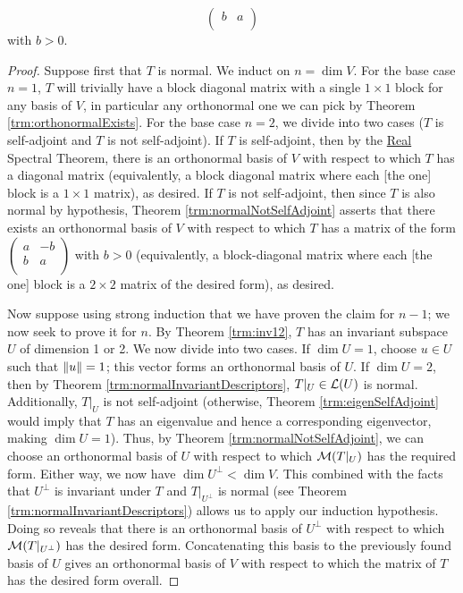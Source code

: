 \documentclass[../main.tex]{subfiles}
\begin{document}
\begin{itemize}
\begin{theorem}
\begin{enumerate}[label={\textup{(}\alph*\textup{)}}]
\begin{equation*}
\begin{pmatrix}
                    b & a\\
                \end{pmatrix}
            \end{equation*}
            with $b>0$.
        \end{enumerate}
        \begin{proof}
            Suppose first that $T$ is normal. We induct on $n=\dim V$. For the base case $n=1$, $T$ will trivially have a block diagonal matrix with a single $1\times 1$ block for any basis of $V$, in particular any orthonormal one we can pick by Theorem \ref{trm:orthonormalExists}. For the base case $n=2$, we divide into two cases ($T$ is self-adjoint and $T$ is not self-adjoint). If $T$ is self-adjoint, then by the \hyperref[trm:RealSpectral]{Real} Spectral Theorem, there is an orthonormal basis of $V$ with respect to which $T$ has a diagonal matrix (equivalently, a block diagonal matrix where each [the one] block is a $1\times 1$ matrix), as desired. If $T$ is not self-adjoint, then since $T$ is also normal by hypothesis, Theorem \ref{trm:normalNotSelfAdjoint} asserts that there exists an orthonormal basis of $V$ with respect to which $T$ has a matrix of the form $
                \left( 
                    \begin{smallmatrix}
                        a & -b\\
                        b & a\\
                    \end{smallmatrix}
                \right)
            $ with $b>0$ (equivalently, a block-diagonal matrix where each [the one] block is a $2\times 2$ matrix of the desired form), as desired.\par
            Now suppose using strong induction that we have proven the claim for $n-1$; we now seek to prove it for $n$. By Theorem \ref{trm:inv12}, $T$ has an invariant subspace $U$ of dimension 1 or 2. We now divide into two cases. If $\dim U=1$, choose $u\in U$ such that $\norm{u}=1$; this vector forms an orthonormal basis of $U$. If $\dim U=2$, then by Theorem \ref{trm:normalInvariantDescriptors}, $T|_U\in\mathcal{L}(U)$ is normal. Additionally, $T|_U$ is not self-adjoint (otherwise, Theorem \ref{trm:eigenSelfAdjoint} would imply that $T$ has an eigenvalue and hence a corresponding eigenvector, making $\dim U=1$). Thus, by Theorem \ref{trm:normalNotSelfAdjoint}, we can choose an orthonormal basis of $U$ with respect to which $\mathcal{M}(T|_U)$ has the required form. Either way, we now have $\dim U^\perp<\dim V$. This combined with the facts that $U^\perp$ is invariant under $T$ and $T|_{U^\perp}$ is normal (see Theorem \ref{trm:normalInvariantDescriptors}) allows us to apply our induction hypothesis. Doing so reveals that there is an orthonormal basis of $U^\perp$ with respect to which $\mathcal{M}(T|_{U^\perp})$ has the desired form. Concatenating this basis to the previously found basis of $U$ gives an orthonormal basis of $V$ with respect to which the matrix of $T$ has the desired form overall.\par\smallskip

\end{proof}
\end{theorem}
\end{itemize}
\end{document}

